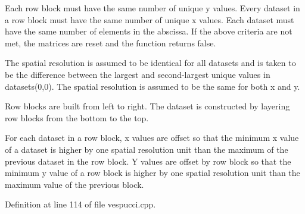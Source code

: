 Each row block must have the same number of unique y values. Every dataset in a row block must have the same number of unique x values. Each dataset must have the same number of elements in the abscissa. If the above criteria are not met, the matrices are reset and the function returns false.

The spatial resolution is assumed to be identical for all datasets and is taken to be the difference between the largest and second-\/largest unique values in datasets(0,0). The spatial resolution is assumed to be the same for both x and y.

Row blocks are built from left to right. The dataset is constructed by layering row blocks from the bottom to the top.

For each dataset in a row block, x values are offset so that the minimum x value of a dataset is higher by one spatial resolution unit than the maximum of the previous dataset in the row block. Y values are offset by row block so that the minimum y value of a row block is higher by one spatial resolution unit than the maximum value of the previous block. 

Definition at line 114 of file vespucci.\+cpp.

